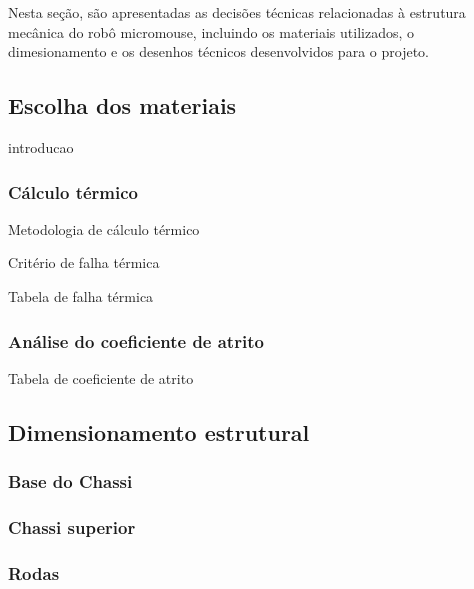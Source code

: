 Nesta seção, são apresentadas as decisões técnicas relacionadas à estrutura mecânica do robô micromouse, incluindo os materiais utilizados, o dimesionamento e os desenhos técnicos desenvolvidos para o projeto.


\subsection{Escolha dos materiais}


introducao

\subsubsection{Cálculo térmico}

Metodologia de cálculo térmico

Critério de falha térmica

Tabela de falha térmica

\subsubsection{Análise do coeficiente de atrito}

Tabela de coeficiente de atrito

\subsection{Dimensionamento estrutural}

\subsubsection{Base do Chassi}

\subsubsection{Chassi superior}

\subsubsection{Rodas}
